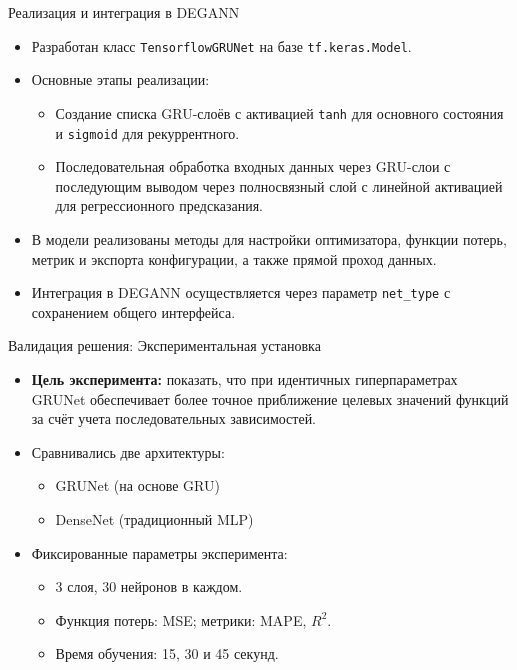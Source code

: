 \documentclass
  [ russian
  , aspectratio=1610 %
  ] {beamer}
\begin{document}
\begin{frame}{Реализация и интеграция в DEGANN}
    \begin{itemize}
        \item Разработан класс \texttt{TensorflowGRUNet} на базе \texttt{tf.keras.Model}.
        \item Основные этапы реализации:
              \begin{itemize}
                  \item Создание списка GRU-слоёв с активацией \texttt{tanh} для основного состояния и \texttt{sigmoid} для рекуррентного.
                  \item Последовательная обработка входных данных через GRU-слои с последующим выводом через полносвязный слой с линейной активацией для регрессионного предсказания.
              \end{itemize}
        \item В модели реализованы методы для настройки оптимизатора, функции потерь, метрик и экспорта конфигурации, а также прямой проход данных.
        \item Интеграция в DEGANN осуществляется через параметр \texttt{net\_type} с сохранением общего интерфейса.
    \end{itemize}
\end{frame}

\begin{frame}{Валидация решения: Экспериментальная установка}
    \begin{itemize}
        \item \textbf{Цель эксперимента:} показать, что при идентичных гиперпараметрах GRUNet обеспечивает более точное приближение целевых значений функций за счёт учета последовательных зависимостей.
        \item Сравнивались две архитектуры:
              \begin{itemize}
                  \item GRUNet (на основе GRU)
                  \item DenseNet (традиционный MLP)
              \end{itemize}
        \item Фиксированные параметры эксперимента:
              \begin{itemize}
                  \item 3 слоя, 30 нейронов в каждом.
                  \item Функция потерь: MSE; метрики: MAPE, \(R^2\).
                  \item Время обучения: 15, 30 и 45 секунд.
              \end{itemize}
    \end{itemize}
\end{frame}
\end{document}
